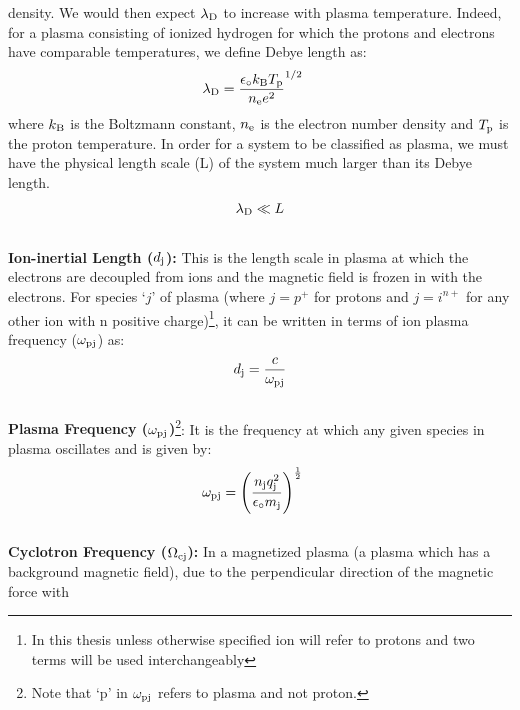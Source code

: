         density.  We would then expect $\lambda_{\rm D}$ to increase with plasma temperature.
        Indeed, for a plasma consisting of ionized hydrogen for which the protons and electrons have
        comparable temperatures, we define Debye length as:
        \begin{align}
            \lambda_{\rm D} & = \frac{\epsilon_\circ k_{\rm B} T_{\rm p}}{n_{\rm e} e^2}^{1/2} \label{eq:debye}
        \end{align}
        where $k_{\rm B}$ is the Boltzmann constant, $n_{\rm e}$ is the electron number density and
        $T_{\rm p}$ is the proton temperature. In order for a system to be classified as plasma, we
        must have the physical length scale (L) of the system much larger than its Debye length.
        \begin{align}
            \lambda_{\rm D} \ll L \label{eq:lambda}
        \end{align}
        \\
        \textbf{Ion-inertial Length ($d_{\rm j}$):} This is the length scale in plasma at which the
        electrons are decoupled from ions and the magnetic field is frozen in with the electrons.
        For species `$j$' of plasma (where $j = p^{+}$ for protons and $j = i^{n+}$ for any other
        ion with n positive charge)\footnote{In this thesis unless otherwise specified ion will
        refer to protons and two terms will be used interchangeably}, it can be written in terms of
        ion plasma frequency ($\omega_{\rm pj}$) as:
        \begin{align}
            d_{\rm j} = \frac{c}{\omega_{\rm pj}} \label{eq:ionint}
        \end{align}
        \\
        \textbf{Plasma Frequency  ($\omega_{\rm pj}$)}\footnote{Note that `p' in $\omega_{\rm pj}$
        refers to plasma and not proton.}: It is the frequency at which any given species in plasma
        oscillates and is given by:
        \begin{align}
            \omega_{\rm pj} & = \left(\frac{n_{\rm j} q_{\rm j}^2}{\epsilon_\circ m_{\rm j}}\right)^{\frac{1}{2}} \label{eq:plasf}
        \end{align}
        \\
        \textbf{Cyclotron Frequency  ($\Omega_{\rm cj}$):} In a magnetized plasma (a plasma which has
        a background magnetic field), due to the perpendicular direction of the magnetic force with
